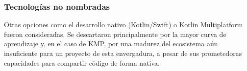 \subsubsection{Tecnologías no nombradas}
Otras opciones como el desarrollo nativo (Kotlin/Swift) o Kotlin Multiplatform fueron consideradas. Se descartaron principalmente por la mayor curva de aprendizaje y, en el caso de KMP, por una madurez del ecosistema aún insuficiente para un proyecto de esta envergadura, a pesar de sus prometedoras capacidades para compartir código de forma nativa.
